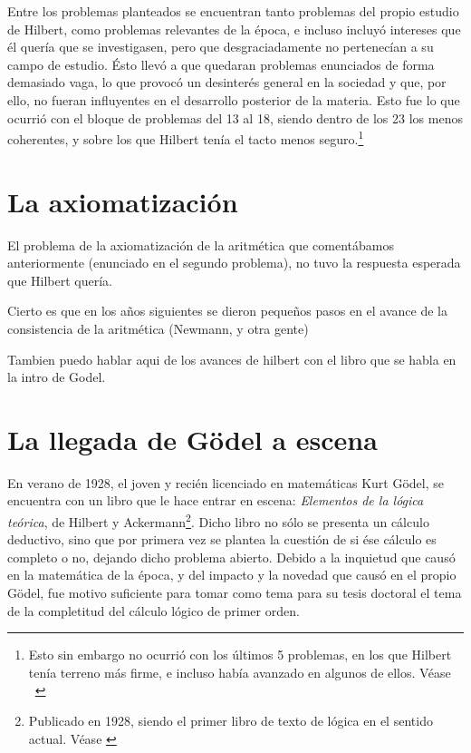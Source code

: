 Entre los problemas planteados se encuentran tanto problemas del propio estudio de Hilbert, como problemas relevantes de la época, e incluso incluyó intereses que él quería que se
investigasen, pero que desgraciadamente no pertenecían a su campo de estudio. Ésto llevó a que quedaran problemas enunciados de forma demasiado vaga, lo que provocó un desinterés 
general en la sociedad y que, por ello, no fueran influyentes en el desarrollo posterior de la materia. Esto fue lo que ocurrió con el bloque de problemas del 13 al 18, siendo dentro
de los 23 los menos coherentes, y sobre los que Hilbert tenía el tacto menos seguro.\footnote{Esto sin embargo no ocurrió con los últimos 5 problemas, en los que Hilbert tenía terreno
más firme, e incluso había avanzado en algunos de ellos. Véase ~\cite[Pág. 85]{BREZIS199876}}  


\section{La axiomatización}

El problema de la axiomatización de la aritmética que comentábamos anteriormente (enunciado en el segundo problema), no tuvo la respuesta esperada que Hilbert quería. 

Cierto es que en los años siguientes se dieron pequeños pasos en el avance de la consistencia de la aritmética (Newmann, y otra gente)

Tambien puedo hablar aqui de los avances de hilbert con el libro que se habla en la intro de Godel.


\section{La llegada de Gödel a escena} 

En verano de 1928, el joven y recién licenciado en matemáticas Kurt Gödel, se encuentra con un libro que le hace entrar en escena: \textit{Elementos de la lógica teórica}, de 
Hilbert y Ackermann\footnote{Publicado en 1928, siendo el primer libro de texto de lógica en el sentido actual. Véase \cite{hilbert1962elementos}}. Dicho libro no sólo se presenta un cálculo deductivo, 
sino que por primera vez se plantea la cuestión de si ése cálculo es completo o no, dejando dicho problema abierto. Debido a la inquietud que causó en la matemática de la época,
y del impacto y la novedad que causó en el propio Gödel, fue motivo suficiente para tomar como tema para su tesis doctoral el tema de la completitud del cálculo lógico de primer orden.

